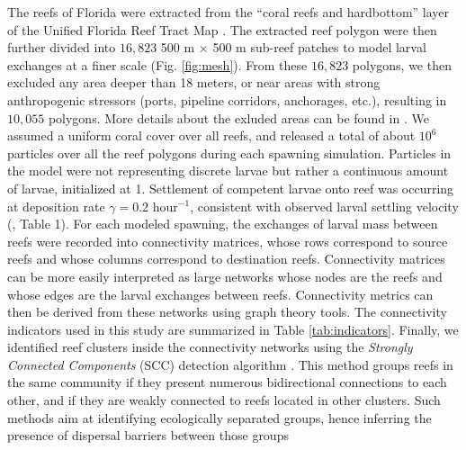 \documentclass[preprint,12pt,authoryear]{elsarticle}
\begin{document}
The reefs of Florida were extracted from the “coral reefs and hardbottom” layer of the Unified Florida Reef Tract Map \citep{fwc2017unified}. The extracted reef polygon were then further divided into $16,823$ 500 m $\times$ 500 m sub-reef patches to model larval exchanges at a finer scale (Fig. \ref{fig:mesh}). From these $16,823$ polygons, we then excluded any area deeper than 18 meters, or near areas with strong anthropogenic stressors (ports, pipeline corridors, anchorages, etc.), resulting in $10,055$ polygons. More details about the exluded areas can be found in \cite{tnc2024}. We assumed a uniform coral cover over all reefs, and released a total of about $10^6$ particles over all the reef polygons during each spawning simulation. Particles in the model were not representing discrete larvae but rather a continuous amount of larvae, initialized at 1. Settlement of competent larvae onto reef was occurring at deposition rate $\gamma = 0.2$ hour$^{-1}$, consistent with observed larval settling velocity (\citealp{hata2017coral}, Table 1). For each modeled spawning, the exchanges of larval mass between reefs were recorded into connectivity matrices, whose rows correspond to source reefs and whose columns correspond to destination reefs. Connectivity matrices can be more easily interpreted as large networks whose nodes are the reefs and whose edges are the larval exchanges between reefs. Connectivity metrics can then be derived from these networks using graph theory tools. The connectivity indicators used in this study are summarized in Table \ref{tab:indicators}. Finally, we identified reef clusters inside the connectivity networks using the \textit{Strongly Connected Components} (SCC) detection algorithm \citep{nuutila1994finding}. This method groups reefs in the same community if they present numerous bidirectional connections to each other, and if they are weakly connected to reefs located in other clusters. Such methods aim at identifying ecologically separated groups, hence inferring the presence of dispersal barriers between those groups \citep{thomas2014numerical,saint2023biophysical}
\end{document}
